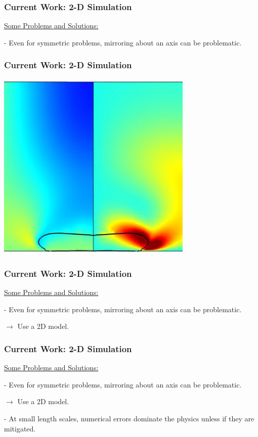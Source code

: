 \documentclass[12pt]{beamer}
\begin{document}
\begin{frame}
    \frametitle{Current Work: 2-D Simulation}
    \underline{Some Problems and Solutions:}

    - Even for symmetric problems, mirroring about an axis can be problematic.
\end{frame}
\begin{frame}
    \frametitle{Current Work: 2-D Simulation}

    \includegraphics[width=0.7\textwidth]{img/11-pillowing.png}
\end{frame}
\begin{frame}
    \frametitle{Current Work: 2-D Simulation}
    \underline{Some Problems and Solutions:}

    - Even for symmetric problems, mirroring about an axis can be problematic.

    $\rightarrow$ Use a 2D model.
\end{frame}
\begin{frame}
    \frametitle{Current Work: 2-D Simulation}
    \underline{Some Problems and Solutions:}

    - Even for symmetric problems, mirroring about an axis can be problematic.

    $\rightarrow$ Use a 2D model.

    - At small length scales, numerical errors dominate the physics unless if 
    they are mitigated.
\end{frame}
\end{document}

